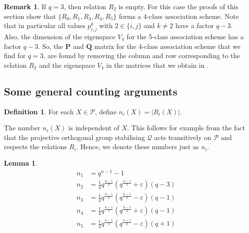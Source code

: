 \documentclass[a4paper]{article}
\newtheorem{lm}[thm]{Lemma}
\theoremstyle{definition}
\newtheorem{rmk}[thm]{Remark}
\newtheorem{df}[thm]{Definition}
\newcommand{\eps}{\varepsilon}
\newcommand{\pp}{\mathcal P}
\newcommand{\mq}{\mathcal Q}
\begin{document}
\begin{rmk}\label{Rem:OrthSchemeForq=3}
 If $q=3$, then relation $R_2$ is empty. For this case the proofs of this section show that $\{R_0,R_1,R_3,R_4,R_5\}$ forms a 4-class association scheme. Note that in particular all values $p^{k}_{i,j}$ with $2\in\{i,j\}$ and $k\neq2$ have a factor $q-3$. Also, the dimension of the eigenspace $V_4$ for the 5-class association scheme has a factor $q-3$. So, the $\mathbf{P}$ and $\mathbf{Q}$ matrix for the 4-class association scheme that we find for $q=3$, are found by removing the column and row corresponding to the relation $R_2$ and the eigenspace $V_4$ in the matrices that we obtain in .
\end{rmk}

\subsection{Some general counting arguments}

\begin{df}
 For each $X \in \pp$, define $n_i(X) = |R_i(X)|$.
\end{df}

The number $n_i(X)$ is independent of $X$.
This follows for example from the fact that the projective orthogonal group stabilising $\mq$ acts transitively on $\pp$ and respects the relations $R_i$.
Hence, we denote these numbers just as $n_i$.

\begin{lm}
 \label{LmValencies}
 \begin{align*}
  n_1 &=  q^{n-1}-1\\
  n_2 &=  \frac 14 q^{\frac{n-1}2} \left(q^{\frac{n-1}2} + \eps \right) (q-3)\\
  n_3 &=  \frac 14 q^{\frac{n-1}2} \left(q^{\frac{n-1}2} - \eps \right) (q-1)\\
  n_4 &=  \frac 14 q^{\frac{n-1}2} \left(q^{\frac{n-1}2} + \eps \right) (q-1)\\
  n_5 &=  \frac 14 q^{\frac{n-1}2} \left(q^{\frac{n-1}2} - \eps \right) (q+1)
 \end{align*}
\end{lm}
\end{document}
